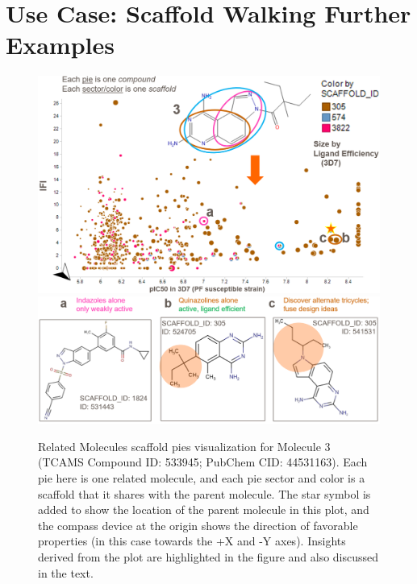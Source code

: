 \documentclass[11pt,letterpaper,biochem]{article}
\begin{document}
\newpage 
\section{Use Case: Scaffold Walking Further Examples}\label{sec:scafwalk_eg}

\begin{figure}
  \centering
  \includegraphics[width=6in]{../fig/mol2_RGtool_scafpie_plot_v4.png}\\
    \vspace{0.1in}
    \includegraphics[width=5.5in]{../fig/mol2_RGtool_scafpie_struc_v2.png}\\
\caption{Related Molecules scaffold pies visualization for Molecule 3 (TCAMS Compound ID: 533945; PubChem CID: 44531163). Each pie here is one related molecule, and each pie sector and color is a scaffold that it shares with the parent molecule. The star symbol is added to show the location of the parent molecule in this plot, and the compass device at the origin shows the direction of favorable properties (in this case towards the +X and -Y axes). Insights derived from the plot are highlighted in the figure and also discussed in the text.}
\label{fig:scafwalk2}
\end{figure}
\end{document}
